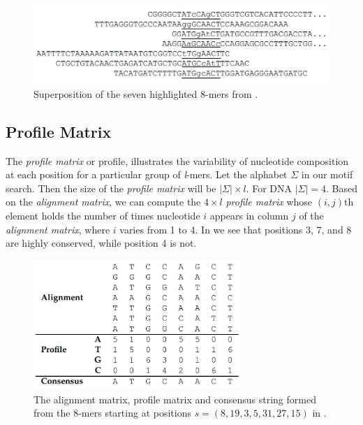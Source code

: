 \begin{figure}%
	\centering
	\includegraphics[width=1.0\textwidth]{figures/superpose}
	\caption{Superposition of the seven highlighted 8-mers from .}
	\label{fig:superpose}
\end{figure}




\subsection{Profile Matrix}
The \textit{profile matrix} or profile, illustrates
the variability of nucleotide composition at each position for
a particular group of \textit{l}-mers. Let the alphabet $ \Sigma $
in our motif search. Then the size of the \textit{profile matrix} will be
$ | \Sigma | \times l$. For DNA $ | \Sigma | = 4$.  Based on the
\textit{alignment matrix}, we can compute the $ 4 \times l $
\textit{profile matrix} whose $ (i, j) $th element holds the
number of times nucleotide $ i $ appears in column
$ j $ of the \textit{alignment matrix}, where $ i $ varies from 1 to 4.
In  we see that positions 3, 7, and
8 are highly conserved, while position 4 is not.

\begin{figure}%
	\centering
	\includegraphics[width=0.7\textwidth]{figures/consensus}
	\caption{The alignment matrix, profile matrix and consensus
		string formed from the 8-mers starting at positions
		$ s = (8, 19, 3, 5, 31, 27, 15) $ in .}
	\label{fig:consensus}
\end{figure}

